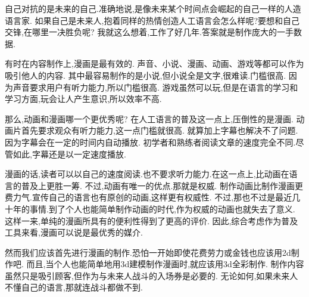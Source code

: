 自己对抗的是未来的自己.准确地说,是像未来某个时间点会崛起的自己一样的人造语言家.
如果自己是未来人,抱着同样的热情创造人工语言会怎么样呢?要想和自己交锋,在哪里一决胜负呢?
我就这么想着,工作了好几年.答案就是制作庞大的一手数据.


有时在内容制作上,漫画是最有效的.
声音、小说、漫画、动画、游戏等都可以作为吸引他人的内容.
其中最容易制作的是小说,但小说全是文字,很难读.门槛很高.
因为声音要求用户有听力能力,所以门槛很高.
游戏虽然可以玩,但是在语言的学习和学习方面,玩会让人产生意识,所以效率不高.

那么,动画和漫画哪一个更优秀呢?
在人工语言的普及这一点上,压倒性的是漫画.
动画片首先要求观众有听力能力,这一点门槛就很高.
就算加上字幕也解决不了问题.因为字幕会在一定的时间内自动播放.
初学者和熟练者阅读文章的速度完全不同.尽管如此,字幕还是以一定速度播放.

漫画的话,读者可以以自己的速度阅读.也不要求听力能力.在这一点上,比动画在语言的普及上更胜一筹.
不过,动画有唯一的优点.那就是权威.
制作动画比制作漫画更费力气.宣传自己的语言也有原创的动画,这样更有权威性.
不过,那也不过是最近几十年的事情.到了个人也能简单制作动画的时代,作为权威的动画也就失去了意义.
这样一来,单纯的漫画所具有的便利性得到了更高的评价.
因此,综合考虑作为普及工具来看,漫画可以说是最优秀的媒介.

然而我们应该首先进行漫画的制作.恐怕一开始即使花费劳力或金钱也应该用2d制作吧.
而且,当个人也能简单地用3d建模制作漫画时,就应该用3d全彩制作.
制作内容虽然只是吸引顾客,但作为与未来人战斗的入场券是必要的.
无论如何,如果未来人不懂自己的语言,那就连战斗都做不到.
